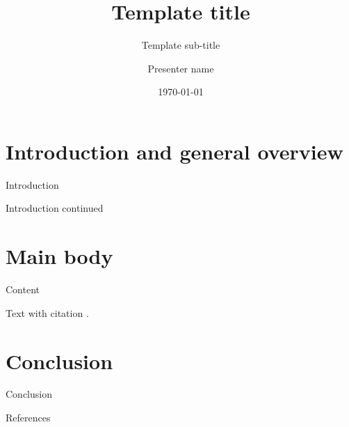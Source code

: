 \documentclass[aspectratio=169,xcolor=dvipsnames]{beamer}
\title[Kriterion]{Template title} %
\subtitle{Template sub-title}
\author[Surname]{Presenter name}
\institute[Institute name]{Istitute name \newline Location}
\date{\today} %
\begin{document}
\begin{frame}[plain]
  \titlepage
\end{frame}


\section{Introduction and general overview}

\begin{frame}{Introduction}
  \lipsum[1]
\end{frame}


\begin{frame}{Introduction continued}
  \lipsum[2]
\end{frame}

\section{Main body}

\begin{frame}{Content}

  Text with citation \cite{Chen2024-fg}.

\end{frame}

\section{Conclusion}

\begin{frame}{Conclusion}

  \lipsum[3]

\end{frame}

\begin{frame}{References}

  
  

\end{frame}
\end{document}
